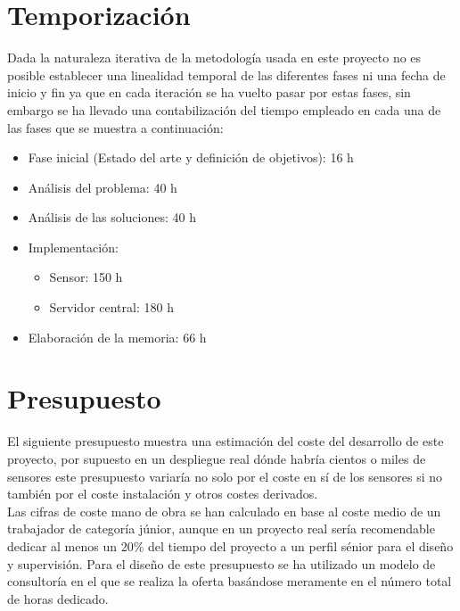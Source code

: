 \documentclass[../proyecto.tex]{subfiles}
\begin{document}
\section{Temporización}

Dada la naturaleza iterativa de la metodología usada en este proyecto no es posible establecer una linealidad  temporal de las diferentes fases ni una fecha de inicio y fin ya que en cada iteración se ha vuelto pasar por estas fases, sin embargo se ha llevado una contabilización del tiempo empleado en cada una de las fases que se muestra a continuación:\\

\begin{itemize}
  \item Fase inicial (Estado del arte y definición de objetivos): 16 h
  \item Análisis del problema: 40 h
  \item Análisis de las soluciones: 40 h
  \item Implementación:
  \begin{itemize}
    \item Sensor: 150 h
    \item Servidor central: 180 h
  \end{itemize}
  \item Elaboración de la memoria: 66 h
\end{itemize}


\section{Presupuesto}

El siguiente presupuesto muestra una estimación del coste del desarrollo de este proyecto, por supuesto en un despliegue real dónde habría cientos o miles de sensores este presupuesto variaría no solo por el coste en sí de los sensores si no también por el coste instalación y otros costes derivados.\\

Las cifras de coste mano de obra se han calculado en base al coste medio de un trabajador de categoría júnior, aunque en un proyecto real sería recomendable dedicar al menos un 20\% del tiempo del proyecto a un perfil sénior para el diseño y supervisión. Para el diseño de este presupuesto se ha utilizado un modelo de consultoría en el que se realiza la oferta basándose meramente en el número total de horas dedicado.\\
\end{document}
